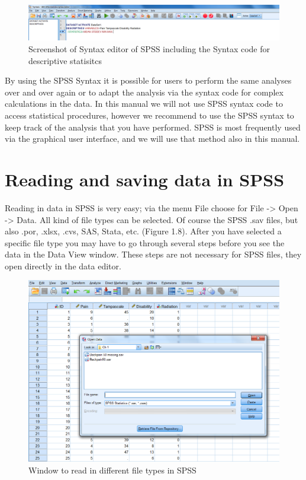 \documentclass[]{book}
\theoremstyle{definition}
\theoremstyle{definition}
\theoremstyle{definition}
\theoremstyle{remark}
\begin{document}
\begin{figure}

{\centering \includegraphics[width=0.9\linewidth]{images/fig1.7} 

}

\caption{Screenshot of Syntax editor of SPSS including the Syntax code for descriptive statisitcs}\label{fig:fig7}
\end{figure}

By using the SPSS Syntax it is possible for users to perform the same
analyses over and over again or to adapt the analysis via the syntax
code for complex calculations in the data. In this manual we will not
use SPSS syntax code to access statistical procedures, however we
recommend to use the SPSS syntax to keep track of the analysis that you
have performed. SPSS is most frequently used via the graphical user
interface, and we will use that method also in this manual.

\section{Reading and saving data in
SPSS}\label{reading-and-saving-data-in-spss}

Reading in data in SPSS is very easy; via the menu File choose for File
-\textgreater{} Open -\textgreater{} Data. All kind of file types can be
selected. Of course the SPSS .sav files, but also .por, .xlsx, .cvs,
SAS, Stata, etc. (Figure 1.8). After you have selected a specific file
type you may have to go through several steps before you see the data in
the Data View window. These steps are not necessary for SPSS files, they
open directly in the data editor.

\begin{figure}

{\centering \includegraphics[width=0.9\linewidth]{images/fig1.8} 

}

\caption{Window to read in different file types in SPSS}\label{fig:fig8}
\end{figure}
\end{document}
